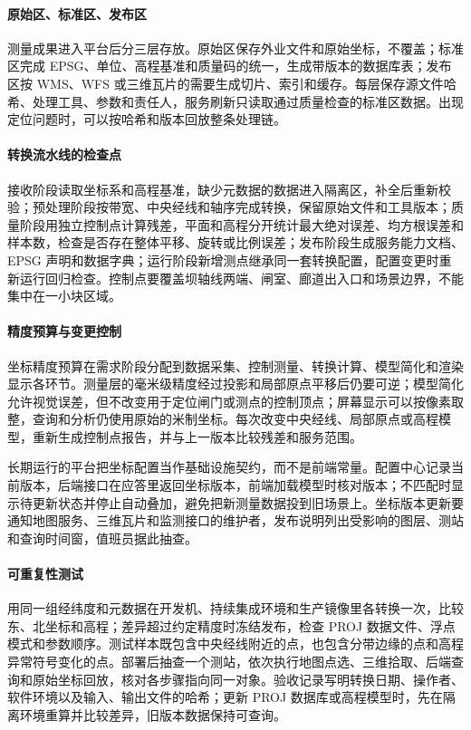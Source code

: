 \paragraph{原始区、标准区、发布区}测量成果进入平台后分三层存放。原始区保存外业文件和原始坐标，不覆盖；标准区完成 EPSG、单位、高程基准和质量码的统一，生成带版本的数据库表；发布区按 WMS、WFS 或三维瓦片的需要生成切片、索引和缓存。每层保存源文件哈希、处理工具、参数和责任人，服务刷新只读取通过质量检查的标准区数据。出现定位问题时，可以按哈希和版本回放整条处理链。

\paragraph{转换流水线的检查点}接收阶段读取坐标系和高程基准，缺少元数据的数据进入隔离区，补全后重新校验；预处理阶段按带宽、中央经线和轴序完成转换，保留原始文件和工具版本；质量阶段用独立控制点计算残差，平面和高程分开统计最大绝对误差、均方根误差和样本数，检查是否存在整体平移、旋转或比例误差；发布阶段生成服务能力文档、EPSG 声明和数据字典；运行阶段新增测点继承同一套转换配置，配置变更时重新运行回归检查。控制点要覆盖坝轴线两端、闸室、廊道出入口和场景边界，不能集中在一小块区域。

\paragraph{精度预算与变更控制}坐标精度预算在需求阶段分配到数据采集、控制测量、转换计算、模型简化和渲染显示各环节。测量层的毫米级精度经过投影和局部原点平移后仍要可逆；模型简化允许视觉误差，但不改变用于定位闸门或测点的控制顶点；屏幕显示可以按像素取整，查询和分析仍使用原始的米制坐标。每次改变中央经线、局部原点或高程模型，重新生成控制点报告，并与上一版本比较残差和服务范围。

长期运行的平台把坐标配置当作基础设施契约，而不是前端常量。配置中心记录当前版本，后端接口在应答里返回坐标版本，前端加载模型时核对版本；不匹配时显示待更新状态并停止自动叠加，避免把新测量数据投到旧场景上。坐标版本更新要通知地图服务、三维瓦片和监测接口的维护者，发布说明列出受影响的图层、测站和查询时间窗，值班员据此抽查。

\paragraph{可重复性测试}用同一组经纬度和元数据在开发机、持续集成环境和生产镜像里各转换一次，比较东、北坐标和高程；差异超过约定精度时冻结发布，检查 PROJ 数据文件、浮点模式和参数顺序。测试样本既包含中央经线附近的点，也包含分带边缘的点和高程异常符号变化的点。部署后抽查一个测站，依次执行地图点选、三维拾取、后端查询和原始坐标回放，核对各步骤指向同一对象。验收记录写明转换日期、操作者、软件环境以及输入、输出文件的哈希；更新 PROJ 数据库或高程模型时，先在隔离环境重算并比较差异，旧版本数据保持可查询。

